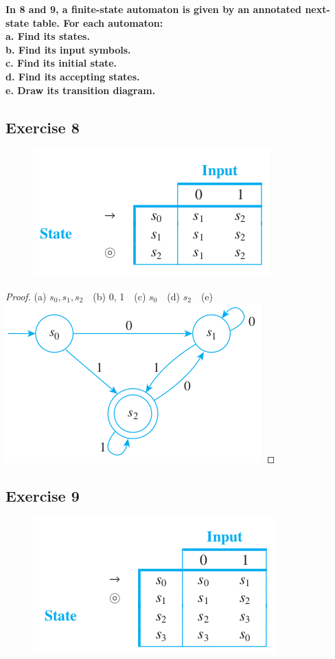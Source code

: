 \documentclass[14pt]{extarticle}
\newcommand{\cy}{\color{cyan}}
\begin{document}
{\bf \cy In 8 and 9, a finite-state automaton is given by an annotated next-state table. For each automaton: \\
a. Find its states. \\
b. Find its input symbols. \\
c. Find its initial state. \\
d. Find its accepting states. \\
e. Draw its transition diagram.}

\subsection{Exercise 8}
\begin{figure}[ht!]
    \centering
    \includegraphics[scale=0.5]{../images/12.2.8.png}
\end{figure}

\begin{proof}
    (a) \(s_0, s_1, s_2\) \,\, (b) 0, 1 \,\, (c) \(s_0\) \,\, (d) \(s_2\) \,\, (e)
    \includegraphics[scale=0.5]{../images/12.2.8.e.png}
\end{proof}

\subsection{Exercise 9}
\begin{figure}[ht!]
    \centering
    \includegraphics[scale=0.5]{../images/12.2.9.png}
\end{figure}
\end{document}
